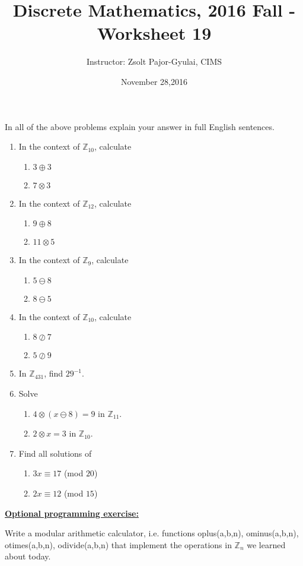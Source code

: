 \documentclass[11pt]{preprint}
\title{Discrete Mathematics, 2016 Fall - Worksheet 19}
\author{Instructor: Zsolt Pajor-Gyulai, CIMS}
\date{November 28,2016}
\def\enumb{\begin{enumerate}}
\def\enume{\end{enumerate}}
\begin{document}
\maketitle

In all of the above problems explain your answer in full English sentences.

\enumb
\item In the context of $\mathbb{Z}_{10}$, calculate
\enumb
\item $3\oplus 3$
\item $7\otimes 3$
\enume
\item In the context of $\mathbb{Z}_ {12}$, calculate
\enumb
\item $9\oplus 8$
\item $11\otimes 5$
\enume
\item In the context of $\mathbb{Z}_9$, calculate
\enumb
\item $5\ominus 8$
\item $8\ominus 5$
\enume

\item In the context of $\mathbb{Z}_{10}$, calculate
\enumb
\item $8\oslash7$
\item $5\oslash 9$
\enume

\item In $\mathbb{Z}_{431}$, find $29^{-1}$.

\item Solve 
\enumb
\item $4\otimes (x\ominus 8)=9$ in $\mathbb{Z}_{11}$.
\item $2\otimes x=3$ in $\mathbb{Z}_{10}$.
\enume

\item Find all solutions of
\enumb
\item $3x\equiv 17$ (mod $20$)
\item $2x\equiv 12$ (mod $15$)
\enume
\enume
\underline{\textbf{Optional programming exercise:}}

\noindent Write a modular arithmetic calculator, i.e. functions oplus(a,b,n), ominus(a,b,n), otimes(a,b,n), odivide(a,b,n) that implement the operations in $\mathbb{Z}_n$ we learned about today.
\end{document}
